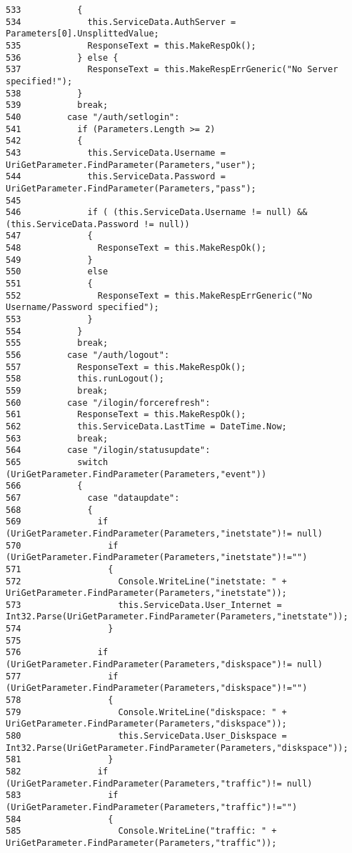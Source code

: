 \begin{verbatim}
533           {
534             this.ServiceData.AuthServer = Parameters[0].UnsplittedValue;
535             ResponseText = this.MakeRespOk();
536           } else {
537             ResponseText = this.MakeRespErrGeneric("No Server specified!");
538           }
539           break;
540         case "/auth/setlogin":
541           if (Parameters.Length >= 2)
542           {
543             this.ServiceData.Username = UriGetParameter.FindParameter(Parameters,"user");
544             this.ServiceData.Password = UriGetParameter.FindParameter(Parameters,"pass");
545       
546             if ( (this.ServiceData.Username != null) && (this.ServiceData.Password != null))
547             {
548               ResponseText = this.MakeRespOk();
549             }
550             else 
551             {
552               ResponseText = this.MakeRespErrGeneric("No Username/Password specified");
553             }
554           }
555           break;
556         case "/auth/logout":
557           ResponseText = this.MakeRespOk();
558           this.runLogout();
559           break;
560         case "/ilogin/forcerefresh":
561           ResponseText = this.MakeRespOk();
562           this.ServiceData.LastTime = DateTime.Now;
563           break;
564         case "/ilogin/statusupdate":
565           switch (UriGetParameter.FindParameter(Parameters,"event"))
566           {
567             case "dataupdate":
568             {
569               if (UriGetParameter.FindParameter(Parameters,"inetstate")!= null)
570                 if (UriGetParameter.FindParameter(Parameters,"inetstate")!="")
571                 {
572                   Console.WriteLine("inetstate: " + UriGetParameter.FindParameter(Parameters,"inetstate"));
573                   this.ServiceData.User_Internet = Int32.Parse(UriGetParameter.FindParameter(Parameters,"inetstate"));
574                 }
575               
576               if (UriGetParameter.FindParameter(Parameters,"diskspace")!= null)
577                 if (UriGetParameter.FindParameter(Parameters,"diskspace")!="")
578                 {
579                   Console.WriteLine("diskspace: " + UriGetParameter.FindParameter(Parameters,"diskspace"));
580                   this.ServiceData.User_Diskspace = Int32.Parse(UriGetParameter.FindParameter(Parameters,"diskspace"));
581                 }
582               if (UriGetParameter.FindParameter(Parameters,"traffic")!= null)
583                 if (UriGetParameter.FindParameter(Parameters,"traffic")!="")
584                 {
585                   Console.WriteLine("traffic: " + UriGetParameter.FindParameter(Parameters,"traffic"));

\end{verbatim}
